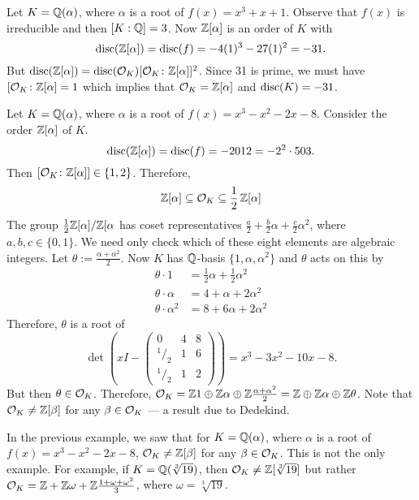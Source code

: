 \begin{ex}
Let $K=\mathbb{Q}(\alpha)$, where $\alpha$ is a root of $f(x)=x^3+x+1$. Observe that $f(x)$ is irreducible and then $[K:\mathbb{Q}]=3$. Now $\mathbb{Z}[\alpha]$ is an order of $K$ with 
	\[
	\operatorname{disc}(\mathbb{Z}[\alpha])= \operatorname{disc}(f)= -4(1)^3 - 27(1)^2= -31.
	\]
But $\operatorname{disc}(\mathbb{Z}[\alpha])= \operatorname{disc}(\mathcal{O}_K) [\mathcal{O}_K \colon \mathbb{Z}[\alpha]]^2$. Since 31 is prime, we must have $[\mathcal{O}_K \colon \mathbb{Z}[\alpha]=1$ which implies that $\mathcal{O}_K=\mathbb{Z}[\alpha]$ and $\operatorname{disc}(K)= -31$. \xqed
\end{ex}

\begin{ex}
Let $K=\mathbb{Q}(\alpha)$, where $\alpha$ is a root of $f(x)= x^3-x^2-2x-8$. Consider the order $\mathbb{Z}[\alpha]$ of $K$. 
	\[
	\operatorname{disc}(\mathbb{Z}[\alpha])= \operatorname{disc}(f)= -2012= -2^2 \cdot 503.
	\]
Then $[\mathcal{O}_K \colon \mathbb{Z}[\alpha]] \in \{1,2\}$. Therefore,
	\[
	\mathbb{Z}[\alpha] \subseteq \mathcal{O}_K \subseteq \dfrac{1}{2} \, \mathbb{Z}[\alpha]
	\]
The group $\frac{1}{2}\mathbb{Z}[\alpha]/\mathbb{Z}[\alpha$ has coset representatives $\frac{a}{2} + \frac{b}{2} \alpha + \frac{c}{2} \alpha^2$, where $a,b,c \in \{0,1\}$. We need only check which of these eight elements are algebraic integers. Let $\theta:= \frac{\alpha + \alpha^2}{2}$. Now $K$ has $\mathbb{Q}$-basis $\{1,\alpha,\alpha^2\}$ and $\theta$ acts on this by
	\[
	\begin{split}
	\theta \cdot 1&= \frac{1}{2} \alpha + \frac{1}{2} \alpha^2 \\
	\theta \cdot \alpha&= 4+\alpha + 2\alpha^2 \\
	\theta \cdot \alpha^2&= 8 + 6\alpha +2\alpha^2
	\end{split}
	\]
Therefore, $\theta$ is a root of 
	\[
	\det\left(xI - 
	\begin{pmatrix}
	0 & 4 & 8 \\
	^1/_2 & 1 & 6 \\
	^1/_2 & 1 & 2 
	\end{pmatrix}
	\right)= x^3 - 3x^2 -10x - 8.
	\]
But then $\theta \in \mathcal{O}_K$. Therefore, $\mathcal{O}_K= \mathbb{Z} 1 \oplus \mathbb{Z} \alpha \oplus \mathbb{Z}\frac{\alpha+\alpha^2}{2}=\mathbb{Z} \oplus \mathbb{Z} \alpha \oplus \mathbb{Z} \theta$. Note that $\mathcal{O}_K \neq \mathbb{Z}[\beta]$ for any $\beta \in \mathcal{O}_K$ --- a result due to Dedekind. \xqed
\end{ex}


\begin{ex}
In the previous example, we saw that for $K=\mathbb{Q}(\alpha)$, where $\alpha$ is a root of $f(x)=x^3-x^2-2x-8$, $\mathcal{O}_K \neq \mathbb{Z}[\beta]$ for any $\beta \in \mathcal{O}_K$. This is not the only example. For example, if $K=\mathbb{Q}(\sqrt[3]{19})$, then $\mathcal{O}_K \neq \mathbb{Z}[\sqrt[3]{19}]$ but rather $\mathcal{O}_K=\mathbb{Z}+\mathbb{Z}\omega+ \mathbb{Z} \frac{1+\omega+\omega^2}{3}$, where $\omega=\sqrt[3]{19}$. \xqed
\end{ex}

